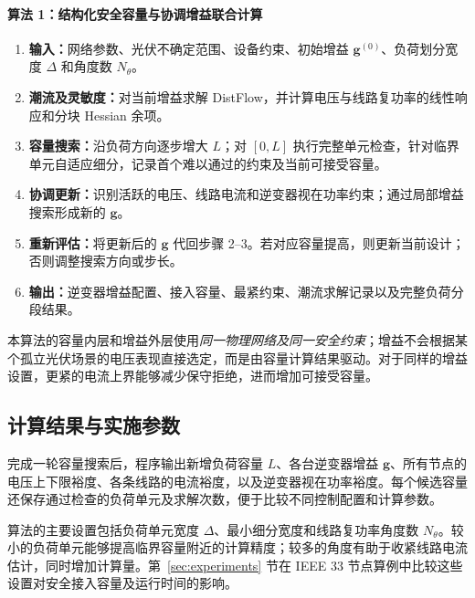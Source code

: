 \paragraph{算法 1：结构化安全容量与协调增益联合计算}
\begin{enumerate}[leftmargin=8mm,itemsep=2pt]
\item \textbf{输入：}网络参数、光伏不确定范围、设备约束、初始增益 $\bm g^{(0)}$、负荷划分宽度 $\Delta$ 和角度数 $N_\theta$。
\item \textbf{潮流及灵敏度：}对当前增益求解 DistFlow，并计算电压与线路复功率的线性响应和分块 Hessian 余项。
\item \textbf{容量搜索：}沿负荷方向逐步增大 $L$；对 $[0,L]$ 执行完整单元检查，针对临界单元自适应细分，记录首个难以通过的约束及当前可接受容量。
\item \textbf{协调更新：}识别活跃的电压、线路电流和逆变器视在功率约束；通过局部增益搜索形成新的 $\bm g$。
\item \textbf{重新评估：}将更新后的 $\bm g$ 代回步骤 2--3。若对应容量提高，则更新当前设计；否则调整搜索方向或步长。
\item \textbf{输出：}逆变器增益配置、接入容量、最紧约束、潮流求解记录以及完整负荷分段结果。
\end{enumerate}

本算法的容量内层和增益外层使用\emph{同一物理网络及同一安全约束}；增益不会根据某个孤立光伏场景的电压表现直接选定，而是由容量计算结果驱动。对于同样的增益设置，更紧的电流上界能够减少保守拒绝，进而增加可接受容量。

\subsection{计算结果与实施参数}

完成一轮容量搜索后，程序输出新增负荷容量 $L$、各台逆变器增益 $\bm g$、所有节点的电压上下限裕度、各条线路的电流裕度，以及逆变器视在功率裕度。每个候选容量还保存通过检查的负荷单元及求解次数，便于比较不同控制配置和计算参数。

算法的主要设置包括负荷单元宽度 $\Delta$、最小细分宽度和线路复功率角度数 $N_\theta$。较小的负荷单元能够提高临界容量附近的计算精度；较多的角度有助于收紧线路电流估计，同时增加计算量。第~\ref{sec:experiments} 节在 IEEE 33 节点算例中比较这些设置对安全接入容量及运行时间的影响。
